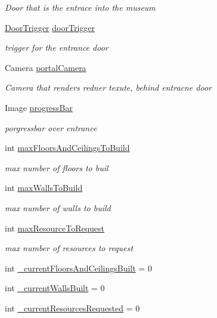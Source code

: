\begin{DoxyCompactItemize}
\begin{DoxyCompactList}\small\item\em Door that is the entrace into the museum \end{DoxyCompactList}\item 
\mbox{\hyperlink{class_door_trigger}{Door\+Trigger}} \mbox{\hyperlink{class_museum_build_observer_a1eab214fddd9d1ba7d573936ea901a8d}{door\+Trigger}}
\begin{DoxyCompactList}\small\item\em trigger for the entrance door \end{DoxyCompactList}\item 
Camera \mbox{\hyperlink{class_museum_build_observer_ab22bb2bf959e8017fdb2c4eb4c209554}{portal\+Camera}}
\begin{DoxyCompactList}\small\item\em Camera that renders redner texute, behind entracne door \end{DoxyCompactList}\item 
Image \mbox{\hyperlink{class_museum_build_observer_ace25103fa08dfc3a95eb261181e1a77b}{progress\+Bar}}
\begin{DoxyCompactList}\small\item\em porgressbar over entrance \end{DoxyCompactList}\item 
int \mbox{\hyperlink{class_museum_build_observer_aed34a9911b192457efff421f0ad04559}{max\+Floors\+And\+Ceilings\+To\+Build}}
\begin{DoxyCompactList}\small\item\em max number of floors to buil \end{DoxyCompactList}\item 
int \mbox{\hyperlink{class_museum_build_observer_a6ba2afcd7f4b4e012471b53e8ecfec7b}{max\+Walls\+To\+Build}}
\begin{DoxyCompactList}\small\item\em max number of walls to build \end{DoxyCompactList}\item 
int \mbox{\hyperlink{class_museum_build_observer_a00f5891dea738079aa9ca90b3188b58e}{max\+Resource\+To\+Request}}
\begin{DoxyCompactList}\small\item\em max number of resources to request \end{DoxyCompactList}\item 
int \mbox{\hyperlink{class_museum_build_observer_ac17e9eb255546c561bcae3744c824aa0}{\+\_\+current\+Floors\+And\+Ceilings\+Built}} = 0
\item 
int \mbox{\hyperlink{class_museum_build_observer_acf9542c010b6e0dbaa7c88ab83cf3cdc}{\+\_\+current\+Walls\+Built}} = 0
\item 
int \mbox{\hyperlink{class_museum_build_observer_af4c87e72e4cc807de7fc70a10b6fb3ea}{\+\_\+current\+Resources\+Requested}} = 0
\end{DoxyCompactItemize}


